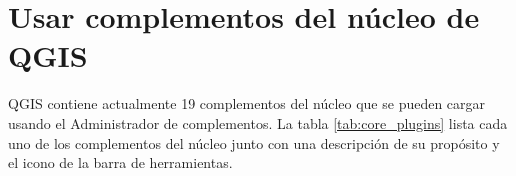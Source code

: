 
\section{Usar complementos del núcleo de QGIS}\label{sec:core_plugins}


QGIS contiene actualmente 19 complementos del núcleo que se pueden cargar usando el Administrador de complementos.
La tabla \ref{tab:core_plugins} lista cada uno de los complementos del núcleo junto con una
descripción de su propósito y el icono de la barra de herramientas.

